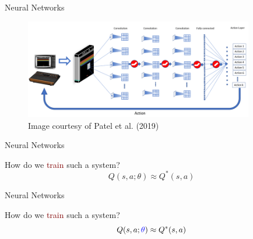 \documentclass{beamer}
\begin{document}
\begin{frame}{Neural Networks}

	\begin{figure}
		\centering
		\includegraphics[width=10cm]{./Images/dqn}
		\caption{Image courtesy of Patel et al. (2019)}
	\end{figure}

\end{frame}

\begin{frame}{Neural Networks}
	\begin{center}
		How do we \textcolor{Maroon}{train} such a system?
		\begin{equation*}  
			Q(s,a;\theta)\approx Q^{*}(s,a)
		\end{equation*}
	\end{center}
\end{frame}



\begin{frame}{Neural Networks}
	\begin{center}
		How do we \textcolor{Maroon}{train} such a system?
		\begin{equation*}  
			Q(s,a; \textcolor{blue}{\theta})\approx Q^{*}(s,a)
		\end{equation*}
	\end{center}
\end{frame}
\end{document}
